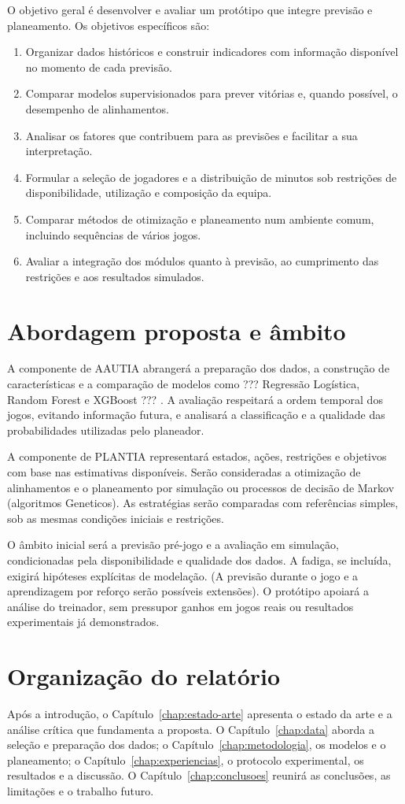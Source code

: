 O objetivo geral é desenvolver e avaliar um protótipo que integre previsão
e planeamento. Os objetivos específicos são:

\begin{enumerate}
  \item Organizar dados históricos e construir indicadores com informação
  disponível no momento de cada previsão.
  \item Comparar modelos supervisionados para prever vitórias e, quando
  possível, o desempenho de alinhamentos.
  \item Analisar os fatores que contribuem para as previsões e facilitar
  a sua interpretação.
  \item Formular a seleção de jogadores e a distribuição de minutos sob
  restrições de disponibilidade, utilização e composição da equipa.
  \item Comparar métodos de otimização e planeamento num ambiente comum,
  incluindo sequências de vários jogos.
  \item Avaliar a integração dos módulos quanto à previsão, ao cumprimento
  das restrições e aos resultados simulados.
\end{enumerate}

\section{Abordagem proposta e âmbito}

A componente de AAUTIA abrangerá a preparação dos dados, a construção de
características e a comparação de modelos como ??? Regressão Logística,
Random Forest e XGBoost ??? . A avaliação respeitará a ordem temporal dos jogos,
evitando informação futura, e analisará a classificação e a qualidade das
probabilidades utilizadas pelo planeador.

A componente de PLANTIA representará estados, ações, restrições e objetivos
com base nas estimativas disponíveis. Serão consideradas a otimização de
alinhamentos e o planeamento por simulação ou processos de decisão de
Markov (algoritmos Geneticos). As estratégias serão comparadas com referências simples, sob as
mesmas condições iniciais e restrições.

O âmbito inicial será a previsão pré-jogo e a avaliação em simulação,
condicionadas pela disponibilidade e qualidade dos dados. A fadiga, se
incluída, exigirá hipóteses explícitas de modelação. (A previsão durante o
jogo e a aprendizagem por reforço serão possíveis extensões). O protótipo
apoiará a análise do treinador, sem pressupor ganhos em jogos reais ou
resultados experimentais já demonstrados.

\section{Organização do relatório}

Após a introdução, o Capítulo~\ref{chap:estado-arte} apresenta o estado da
arte e a análise crítica que fundamenta a proposta.
O Capítulo~\ref{chap:data} aborda a seleção e preparação dos dados;
o Capítulo~\ref{chap:metodologia}, os modelos e o planeamento; o Capítulo~\ref{chap:experiencias}, o protocolo
experimental, os resultados e a discussão.
O Capítulo~\ref{chap:conclusoes} reunirá as conclusões, as limitações e o
trabalho futuro.
